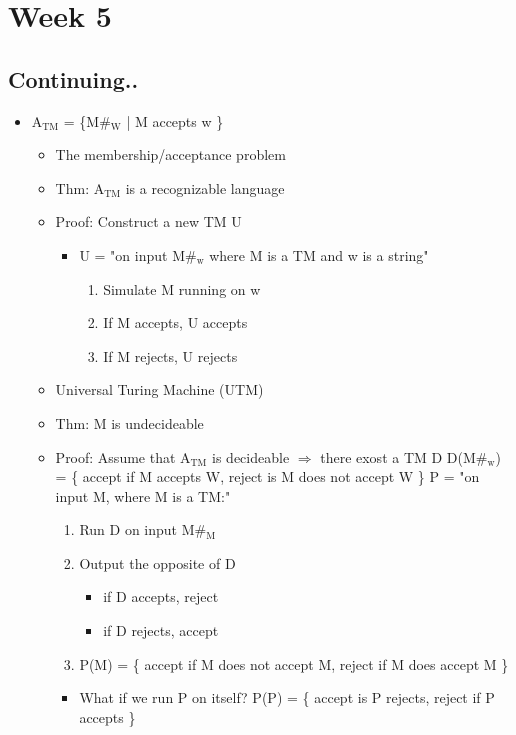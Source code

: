 \documentclass[11pt]{article}
\begin{document}
\section{Week 5}
\label{sec:org07c6160}
\subsection{Continuing..}
\label{sec:org5982687}
\begin{itemize}
\item A\(_{\text{TM}}\) = \{M\#\(_{\text{W}}\) | M accepts w \}
\begin{itemize}
\item The membership/acceptance problem
\item Thm: A\(_{\text{TM}}\) is a recognizable language
\item Proof: Construct a new TM U
\begin{itemize}
\item U = "on input M\#\(_{\text{w}}\) where M is a TM and w is a string"
\begin{enumerate}
\item Simulate M running on w
\item If M accepts, U accepts
\item If M rejects, U rejects
\end{enumerate}
\end{itemize}
\item Universal Turing Machine (UTM)
\item Thm: M is undecideable
\item Proof: Assume that A\(_{\text{TM}}\) is decideable
\(\Rightarrow\) there exost a TM D
D(M\#\(_{\text{w}}\)) = \{ accept if M accepts W, reject is M does not accept W \} 
P = "on input M, where M is a TM:"
\begin{enumerate}
\item Run D on input M\#\(_{\text{M}}\)
\item Output the opposite of D
\begin{itemize}
\item if D accepts, reject
\item if D rejects, accept
\end{itemize}
\item P(M) = \{ accept if M does not accept M, reject if M does accept M \}
\end{enumerate}
\begin{itemize}
\item What if we run P on itself?
P(P) = \{ accept is P rejects, reject if P accepts \}

\end{itemize}
\end{itemize}
\end{itemize}
\end{document}
